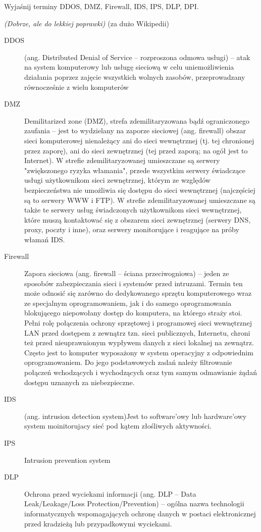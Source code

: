 \documentclass[answers,11pt]{exam}
\newcommand{\fixit}{\textit{(Dobrze, ale do lekkiej poprawki)} }
\begin{document}
\begin{questions}
\question Wyjaśnij terminy DDOS, DMZ, Firewall, IDS, IPS, DLP, DPI.
\begin{solution}
\fixit (za dużo Wikipedii)
\begin{description}
\item[DDOS] (ang. Distributed Denial of Service – rozproszona odmowa usługi) – atak na system komputerowy lub usługę sieciową w celu uniemożliwienia działania poprzez zajęcie wszystkich wolnych zasobów, przeprowadzany równocześnie z wielu komputerów
\item[DMZ]
Demilitarized zone (DMZ), strefa zdemilitaryzowana bądź ograniczonego zaufania – jest to wydzielany na zaporze sieciowej (ang. firewall) obszar sieci komputerowej nienależący ani do sieci wewnętrznej (tj. tej chronionej przez zaporę), ani do sieci zewnętrznej (tej przed zaporą; na ogół jest to Internet). W strefie zdemilitaryzowanej umieszczane są serwery "zwiększonego ryzyka włamania", przede wszystkim serwery świadczące usługi użytkownikom sieci zewnętrznej, którym ze względów bezpieczeństwa nie umożliwia się dostępu do sieci wewnętrznej (najczęściej są to serwery WWW i FTP). W strefie zdemilitaryzowanej umieszczane są także te serwery usług świadczonych użytkownikom sieci wewnętrznej, które muszą kontaktować się z obszarem sieci zewnętrznej (serwery DNS, proxy, poczty i inne), oraz serwery monitorujące i reagujące na próby włamań IDS.
\item[Firewall]
Zapora sieciowa (ang. firewall – ściana przeciwogniowa) – jeden ze sposobów zabezpieczania sieci i systemów przed intruzami.
Termin ten może odnosić się zarówno do dedykowanego sprzętu komputerowego wraz ze specjalnym oprogramowaniem, jak i do samego oprogramowania blokującego niepowołany dostęp do komputera, na którego straży stoi. Pełni rolę połączenia ochrony sprzętowej i programowej sieci wewnętrznej LAN przed dostępem z zewnątrz tzn. sieci publicznych, Internetu, chroni też przed nieuprawnionym wypływem danych z sieci lokalnej na zewnątrz. Często jest to komputer wyposażony w system operacyjny z odpowiednim oprogramowaniem. Do jego podstawowych zadań należy filtrowanie połączeń wchodzących i wychodzących oraz tym samym odmawianie żądań dostępu uznanych za niebezpieczne.
\item[IDS]
(ang. intrusion detection system)Jest to software'owy lub hardware'owy system moinitorujacy sieć pod kątem złośliwych aktywności. 
\item[IPS]
Intrusion prevention system
\item[DLP]
Ochrona przed wyciekami informacji (ang. DLP – Data Leak/Leakage/Loss Protection/Prevention) – ogólna nazwa technologii informatycznych wspomagających ochronę danych w postaci elektronicznej przed kradzieżą lub przypadkowymi wyciekami.

\end{description}
\end{solution}
\end{questions}
\end{document}
